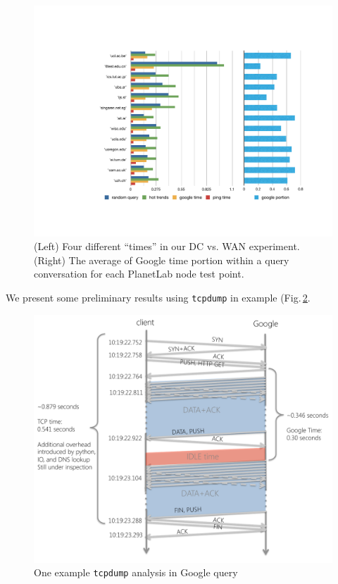 \begin{figure}[!htb]
  \centering
  \includegraphics[width=\linewidth]{../figs/data_center.pdf}
  \caption{(Left) Four different ``times'' in our DC vs. WAN experiment. (Right) The average of Google time portion within a query conversation for each PlanetLab node test point.}
  \label{fig:data_center}
\end{figure}

 We present some preliminary results using \texttt{tcpdump} in example (Fig.\,\ref{fig:tcpdump}.

\begin{figure}
  \centering
  \includegraphics[width=\linewidth]{../figs/tcpdump.pdf}
  \caption{One example \texttt{tcpdump} analysis in Google query}
  \label{fig:tcpdump}
\end{figure}

